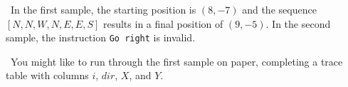 \Sample


\Explanation\ In the first sample, the starting position is $(8,-7)$ and the sequence
$[N,N,W,N,\allowbreak E,E,S]$ results in a final position of $(9,-5)$. In the second
sample, the instruction \texttt{Go right} is invalid.

\Scratch\ You might like to run through the first sample on paper, completing a trace
table with columns $i$, $dir$, $X$, and $Y$.

